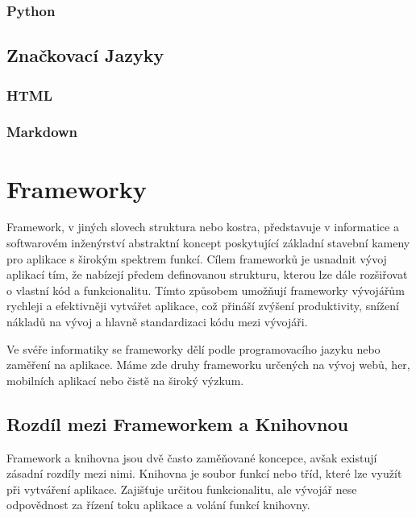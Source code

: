 \subsubsection{Python}
\label{subsubsec:languages-interpreted-python}

\subsection{Značkovací Jazyky}
\label{subsec:languages-markup}

\subsubsection{HTML}
\label{subsubsec:languages-markup-html}

\subsubsection{Markdown}
\label{subsubsec:languages-markup-markdown}

\section{Frameworky}
\label{sec:dev-framework}
Framework, v jiných slovech struktura nebo kostra, představuje v informatice a softwarovém inženýrství abstraktní koncept poskytující základní stavební kameny pro aplikace s širokým spektrem funkcí. Cílem frameworků je usnadnit vývoj aplikací tím, že nabízejí předem definovanou strukturu, kterou lze dále rozšiřovat o vlastní kód a funkcionalitu. Tímto způsobem umožňují frameworky vývojářům rychleji a efektivněji vytvářet aplikace, což přináší zvýšení produktivity, snížení nákladů na vývoj a hlavně standardizaci kódu mezi vývojáři.

Ve svéře informatiky se frameworky dělí podle programovacího jazyku nebo zaměření na aplikace. Máme zde druhy frameworku určených na vývoj webů, her, mobilních aplikací nebo čistě na široký výzkum. \cite{about_framework}

\subsection*{Rozdíl mezi Frameworkem a Knihovnou}
Framework a knihovna jsou dvě často zaměňované koncepce, avšak existují zásadní rozdíly mezi nimi. Knihovna je soubor funkcí nebo tříd, které lze využít při vytváření aplikace. Zajišťuje určitou funkcionalitu, ale vývojář nese odpovědnost za řízení toku aplikace a volání funkcí knihovny.

